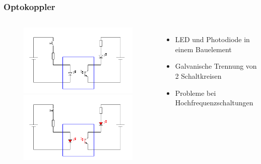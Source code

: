 \begin{frame}
\begin{columns}[c]
\begin{figure}
	\end{figure}
    \end{columns}
\end{frame}

\begin{frame}
    \frametitle{Optokoppler}
    \begin{columns}[c]
        \column[c]{5cm}
        \begin{center}
	\begin{figure}
            \includegraphics[width=1\textwidth, height=.4\textheight, keepaspectratio]{e12/Optokoppler_Aus.png}\\
            \includegraphics[width=1\textwidth, height=.4\textheight, keepaspectratio]{e12/Optokoppler_An.png}
	\end{figure}
        \end{center}
        \column{5cm}
    \begin{itemize}
			\item LED und Photodiode in einem Bauelement
			\item Galvanische Trennung von 2 Schaltkreisen
			\item Probleme bei Hochfrequenzschaltungen
    \end{itemize}
    \end{columns}
\end{frame}


